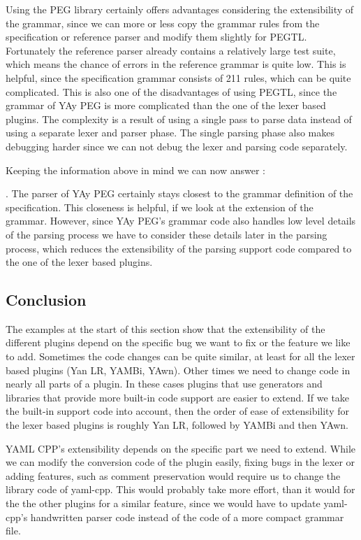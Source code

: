 Using the PEG library certainly offers advantages considering the extensibility of the grammar, since we can more or less copy the grammar rules from the specification or reference parser and modify them slightly for \gls{PEGTL}. Fortunately the reference parser already contains a relatively large test suite, which means the chance of errors in the reference grammar is quite low. This is helpful, since the specification grammar consists of 211 rules, which can be quite complicated. This is also one of the disadvantages of using \gls{PEGTL}, since the grammar of YAy PEG is more complicated than the one of the lexer based plugins. The complexity is a result of using a single pass to parse  data instead of using a separate lexer and parser phase. The single parsing phase also makes debugging harder since we can not debug the lexer and parsing code separately.

Keeping the information above in mind we can now answer :

  \closeness*

. The parser of YAy PEG certainly stays closest to the grammar definition of the  specification. This closeness is helpful, if we look at the extension of the grammar. However, since YAy PEG’s grammar code also handles low level details of the parsing process we have to consider these details later in the parsing process, which reduces the extensibility of the parsing support code compared to the one of the lexer based plugins.

\subsection{Conclusion}

The examples at the start of this section show that the extensibility of the different  plugins depend on the specific bug we want to fix or the feature we like to add. Sometimes the code changes can be quite similar, at least for all the lexer based plugins (Yan LR, YAMBi, YAwn). Other times we need to change code in nearly all parts of a plugin. In these cases plugins that use generators and libraries that provide more built-in code support are easier to extend. If we take the built-in support code into account, then the order of ease of extensibility for the lexer based plugins is roughly Yan LR, followed by YAMBi and then YAwn.

YAML CPP’s extensibility depends on the specific part we need to extend. While we can modify the conversion code of the plugin easily, fixing bugs in the lexer or adding features, such as comment preservation would require us to change the library code of yaml-cpp. This would probably take more effort, than it would for the the other  plugins for a similar feature, since we would have to update yaml-cpp’s handwritten parser code instead of the code of a more compact grammar file.

